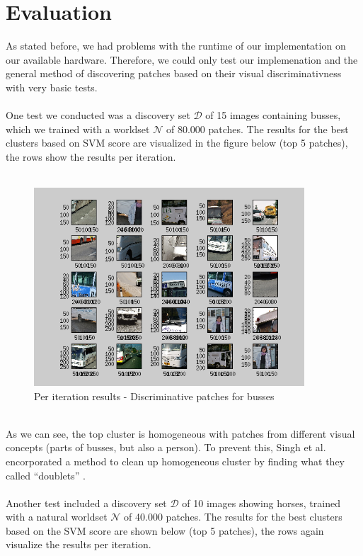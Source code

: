\section{Evaluation}

As stated before, we had problems with the runtime of our implementation on our available hardware.
Therefore, we could only test our implemenation and the general method of discovering patches based on their visual
discriminativness with very basic tests.\\
\\
One test we conducted was a discovery set $\mathcal{D}$ of 15 images containing busses, which we trained with a worldset 
$\mathcal{N}$ of 80.000 patches. The results for the best clusters based on SVM score are visualized in the figure below (top 5 patches), 
the rows show the results per iteration.\\
\\
\begin{figure}[h!]
\centering
\includegraphics[width=0.9\textwidth]{figures/busses.png}
\caption{Per iteration results - Discriminative patches for busses}
\end{figure}
\\
As we can see, the top cluster is homogeneous with patches from different visual concepts (parts of busses, but also a person).
To prevent this, Singh et al. encorporated a method to clean up homogeneous cluster by finding what they called ``doublets'' \cite{Singh2012DiscPat}.\\
\\
Another test included a discovery set $\mathcal{D}$ of 10 images showing horses, trained with a natural worldset $\mathcal{N}$ of 40.000 patches.
The results for the best clusters based on the SVM score are shown below (top 5 patches), the rows again visualize the results per iteration.

